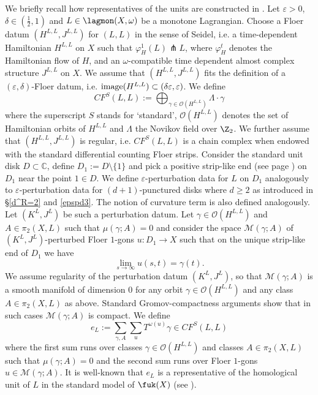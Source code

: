 	We briefly recall how representatives of the units are constructed in \cite{Se:book-fukaya-categ}. Let $\varepsilon>0$, $\delta\in \left(\frac{1}{2},1\right)$ and $L\in \lagmon(X,\omega)$ be a monotone Lagrangian. Choose a Floer datum $(H^{L,L},J^{L,L})$ for $(L,L)$ in the sense of Seidel, i.e. a time-dependent Hamiltonian $H^{L,L}$ on $X$ such that $\varphi_H^1(L)\pitchfork L$, where $\varphi_H^t$ denotes the Hamiltonian flow of $H$, and an $\omega$-compatible time dependent almost complex structure $J^{L,L}$ on $X$. We assume that $(H^{L,L},J^{L,L})$ fits the definition of a $(\varepsilon,\delta)$-Floer datum, i.e. $\textnormal{image}(H^{L,L})\subset \left(\delta\varepsilon, \varepsilon\right)$. We define $$CF^S(L,L):=\bigoplus_{\gamma\in \mathcal{O}(H^{L,L})}\Lambda \cdot \gamma$$ where the superscript $S$ stands for `standard', $\mathcal{O}(H^{L,L})$ denotes the set of Hamiltonian orbits of $H^{L,L}$ and $\Lambda$ the Novikov field over $\Z_2$. We further assume that $(H^{L,L},J^{L,L})$ is regular, i.e. $CF^S(L,L)$ is a chain complex when endowed with the standard differential counting Floer strips.
	Consider the standard unit disk $D\subset \mathbb C$, define $D_1:=D\setminus\{1\}$ and pick a positive strip-like end (see page \pageref{striplikends}) on $D_1$ near the point $1\in D$. We define $\varepsilon$-perturbation data for $L$ on $D_1$ analogously to $\varepsilon$-perturbation data for $(d+1)$-punctured disks where $d\geq 2$ as introduced in \S \ref{d^R=2} and \ref{epspd3}. The notion of curvature term is also defined analogously. Let $(K^L,J^L)$ be such a perturbation datum. Let $\gamma\in \mathcal{O}(H^{L,L})$ and $A\in \pi_2(X,L)$ such that $\mu(\gamma;A)=0$ and consider the space $\mathcal{M}(\gamma;A)$ of $(K^L,J^L)$-perturbed Floer $1$-gons $u:D_1\to X$ such that on the unique strip-like end of $D_1$ we have $$\lim_{s\rightarrow \infty}u(s,t)=\gamma(t).$$ We assume regularity of the perturbation datum $(K^L,J^L)$, so that $\mathcal{M}(\gamma;A)$ is a smooth manifold of dimension $0$ for any orbit $\gamma\in \mathcal{O}(H^{L,L})$ and any class $A\in \pi_2(X,L)$ as above. Standard Gromov-compactness arguments show that in such cases $\mathcal{M}(\gamma;A)$ is compact. We define $$e_L:=\sum_{\gamma,A}\sum_u T^{\omega(u)}\gamma\in CF^S(L,L)$$ where the first sum runs over classes $\gamma\in \mathcal{O}(H^{L,L})$ and classes $A\in \pi_2(X,L)$ such that $\mu(\gamma;A)=0$ and the second sum runs over Floer $1$-gons $u\in \mathcal{M}(\gamma;A)$. It is well-known that $e_L$ is a representative of the homological unit of $L$ in the standard model of $\fuk(X)$ (see \cite[Section 8d]{Se:book-fukaya-categ}).
	
